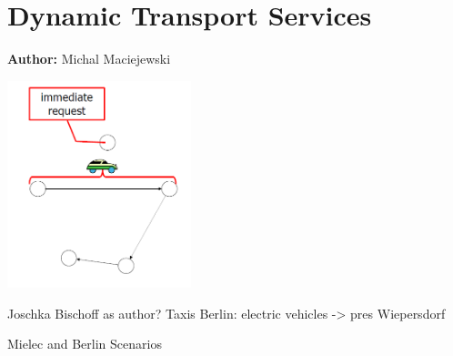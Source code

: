 \chapter{Dynamic Transport Services }
\label{ch:dts}

\hfill \textbf{Author:} Michal Maciejewski

\begin{center} \includegraphics[width=0.4\textwidth, angle=0]{extending/figures/DTS/dts.png} \end{center}

Joschka Bischoff as author?
Taxis Berlin: electric vehicles -> pres Wiepersdorf

Mielec and Berlin Scenarios
